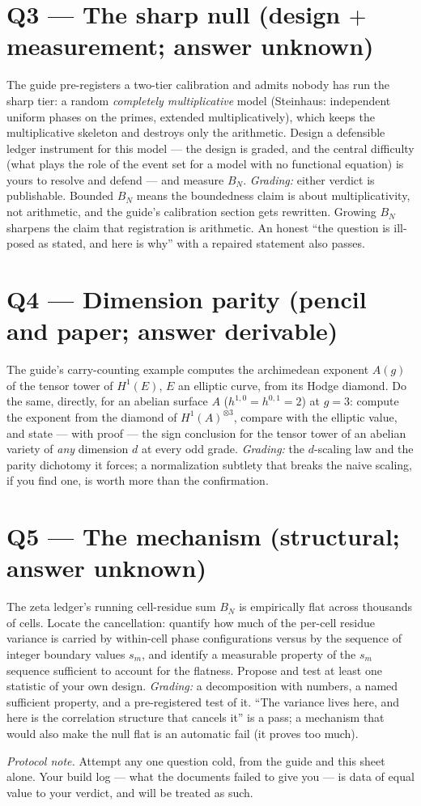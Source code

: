 \documentclass[11pt]{article}
\begin{document}
\section*{Q3 --- The sharp null (design $+$ measurement; answer unknown)}
The guide pre-registers a two-tier calibration and admits nobody has run the
sharp tier: a random \emph{completely multiplicative} model (Steinhaus:
independent uniform phases on the primes, extended multiplicatively), which
keeps the multiplicative skeleton and destroys only the arithmetic.  Design a
defensible ledger instrument for this model --- the design is graded, and the
central difficulty (what plays the role of the event set for a model with no
functional equation) is yours to resolve and defend --- and measure $B_N$.
\emph{Grading:} either verdict is publishable.  Bounded $B_N$ means the
boundedness claim is about multiplicativity, not arithmetic, and the guide's
calibration section gets rewritten.  Growing $B_N$ sharpens the claim that
registration is arithmetic.  An honest ``the question is ill-posed as stated,
and here is why'' with a repaired statement also passes.

\section*{Q4 --- Dimension parity (pencil and paper; answer derivable)}
The guide's carry-counting example computes the archimedean exponent $A(g)$ of
the tensor tower of $H^1(E)$, $E$ an elliptic curve, from its Hodge diamond.
Do the same, directly, for an abelian surface $A$ ($h^{1,0}=h^{0,1}=2$) at
$g=3$: compute the exponent from the diamond of $H^1(A)^{\otimes3}$, compare
with the elliptic value, and state --- with proof --- the sign conclusion for
the tensor tower of an abelian variety of \emph{any} dimension $d$ at every odd
grade.  \emph{Grading:} the $d$-scaling law and the parity dichotomy it forces;
a normalization subtlety that breaks the naive scaling, if you find one, is
worth more than the confirmation.

\section*{Q5 --- The mechanism (structural; answer unknown)}
The zeta ledger's running cell-residue sum $B_N$ is empirically flat across
thousands of cells.  Locate the cancellation: quantify how much of the
per-cell residue variance is carried by within-cell phase configurations
versus by the sequence of integer boundary values $s_m$, and identify a
measurable property of the $s_m$ sequence sufficient to account for the
flatness.  Propose and test at least one statistic of your own design.
\emph{Grading:} a decomposition with numbers, a named sufficient property, and
a pre-registered test of it.  ``The variance lives here, and here is the
correlation structure that cancels it'' is a pass; a mechanism that would also
make the null flat is an automatic fail (it proves too much).

\bigskip
\noindent\emph{Protocol note.}  Attempt any one question cold, from the guide
and this sheet alone.  Your build log --- what the documents failed to give you
--- is data of equal value to your verdict, and will be treated as such.
\end{document}
